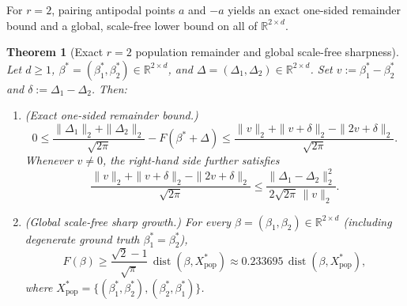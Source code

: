 \documentclass[11pt]{article}
\theoremstyle{plain}
\newtheorem{theorem}{Theorem}[section]
\theoremstyle{remark}
\numberwithin{equation}{section}
\newcommand{\R}{\mathbb{R}}
\newcommand{\norm}[1]{\|#1\|}
\newcommand{\dist}{\operatorname{dist}}
\begin{document}
For $r = 2$, pairing antipodal points $a$ and $-a$ yields an exact one-sided remainder bound and a global, scale-free lower bound on all of $\R^{2 \times d}$.

\begin{theorem}[Exact $r = 2$ population remainder and global scale-free sharpness]
  \label{thm:pop-r2}
  Let $d \ge 1$, $\beta^* = (\beta_1^*, \beta_2^*) \in \R^{2 \times d}$, and $\Delta = (\Delta_1, \Delta_2) \in \R^{2 \times d}$. Set $v := \beta_1^* - \beta_2^*$ and $\delta := \Delta_1 - \Delta_2$. Then:
  \begin{enumerate}[label=(\alph*)]
    \item \emph{(Exact one-sided remainder bound.)}
    \begin{equation}
      \label{eq:thm2-rem}
      0 \le \frac{\norm{\Delta_1}_2 + \norm{\Delta_2}_2}{\sqrt{2\pi}} - F(\beta^* + \Delta)
        \le \frac{\norm{v}_2 + \norm{v + \delta}_2 - \norm{2v + \delta}_2}{\sqrt{2\pi}}.
    \end{equation}
    Whenever $v \ne 0$, the right-hand side further satisfies
    \begin{equation}
      \label{eq:thm2-quad}
      \frac{\norm{v}_2 + \norm{v + \delta}_2 - \norm{2v + \delta}_2}{\sqrt{2\pi}}
      \le \frac{\norm{\Delta_1 - \Delta_2}_2^2}{2\sqrt{2\pi}\,\norm{v}_2}.
    \end{equation}
    \item \emph{(Global scale-free sharp growth.)} For every $\beta = (\beta_1, \beta_2) \in \R^{2 \times d}$ (including degenerate ground truth $\beta_1^* = \beta_2^*$),
    \begin{equation}
      \label{eq:thm2-global}
      F(\beta) \ge \frac{\sqrt{2} - 1}{\sqrt{\pi}}\,\dist(\beta, X_{\mathrm{pop}}^*)
      \approx 0.233695\,\dist(\beta, X_{\mathrm{pop}}^*),
    \end{equation}
    where $X_{\mathrm{pop}}^* = \{(\beta_1^*, \beta_2^*), (\beta_2^*, \beta_1^*)\}$.
  \end{enumerate}
\end{theorem}
\end{document}
